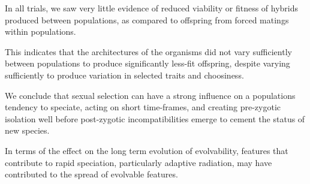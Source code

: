 In all trials, we saw very little evidence of reduced viability or fitness of hybrids produced between populations, as compared to offspring from forced matings within populations.

This indicates that the architectures of the organisms did not vary sufficiently between populations to produce significantly less-fit offspring, despite varying sufficiently to produce variation in selected traits and choosiness.

We conclude that sexual selection can have a strong influence on a populations tendency to speciate, acting on short time-frames, and creating pre-zygotic isolation well before post-zygotic incompatibilities emerge to cement the status of new species.

In terms of the effect on the long term evolution of evolvability, features that contribute to rapid speciation, particularly adaptive radiation, may have contributed to the spread of evolvable features.